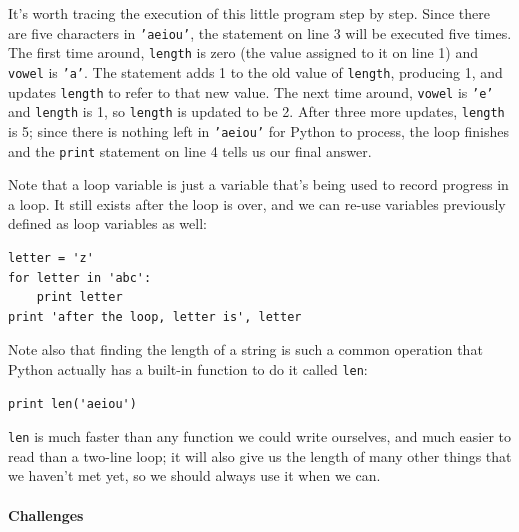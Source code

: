 \documentclass{book}
\begin{document}
It's worth tracing the execution of this little program step by step.
Since there are five characters in \texttt{'aeiou'}, the statement on
line 3 will be executed five times. The first time around,
\texttt{length} is zero (the value assigned to it on line 1) and
\texttt{vowel} is \texttt{'a'}. The statement adds 1 to the old value of
\texttt{length}, producing 1, and updates \texttt{length} to refer to
that new value. The next time around, \texttt{vowel} is \texttt{'e'} and
\texttt{length} is 1, so \texttt{length} is updated to be 2. After three
more updates, \texttt{length} is 5; since there is nothing left in
\texttt{'aeiou'} for Python to process, the loop finishes and the
\texttt{print} statement on line 4 tells us our final answer.

Note that a loop variable is just a variable that's being used to record
progress in a loop. It still exists after the loop is over, and we can
re-use variables previously defined as loop variables as well:

\begin{verbatim}
letter = 'z'
for letter in 'abc':
    print letter
print 'after the loop, letter is', letter
\end{verbatim}

Note also that finding the length of a string is such a common operation
that Python actually has a built-in function to do it called
\texttt{len}:

\begin{verbatim}
print len('aeiou')
\end{verbatim}

\texttt{len} is much faster than any function we could write ourselves,
and much easier to read than a two-line loop; it will also give us the
length of many other things that we haven't met yet, so we should always
use it when we can.

\mbox{}\paragraph{Challenges}
\end{document}
